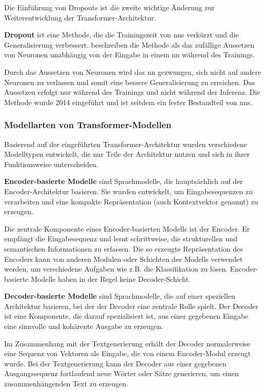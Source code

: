 Die Einführung von Dropouts ist die zweite wichtige Änderung zur Weiterentwicklung der Transformer-Architektur.
\begin{definition}\label{def:dropout}
    \textbf{Dropout} ist eine Methode, die die Trainingszeit von \ac{nn}s verkürzt und die Generalisierung verbessert.
    \citet{dropout} beschreiben die Methode als das zufällige Aussetzen von Neuronen unabhängig von der Eingabe in einem \ac{nn} während des Trainings.
\end{definition}
Durch das Aussetzen von Neuronen wird das \ac{nn} gezwungen, sich nicht auf andere Neuronen zu verlassen und somit eine bessere Generalisierung zu erreichen.
Das Aussetzen erfolgt nur während des Trainings und nicht während der Inferenz.
Die Methode wurde 2014 eingeführt und ist seitdem ein fester Bestandteil von \ac{nn}s.\\

\subsubsection{Modellarten von Transformer-Modellen}

Basierend auf der eingeführten Transformer-Architektur wurden verschiedene Modelltypen entwickelt, die nur Teile der Architektur nutzen und sich in ihrer Funktionsweise unterscheiden.

\begin{definition}\label{def:encoder-basierte-modelle}
    \textbf{Encoder-basierte Modelle} sind Sprachmodelle, die hauptsächlich auf der Encoder-Architektur basieren.
    Sie wurden entwickelt, um Eingabesequenzen zu verarbeiten und eine kompakte Repräsentation (auch Kontextvektor genannt) zu erzeugen.
\end{definition}
Die zentrale Komponente eines Encoder-basierten Modells ist der Encoder.
Er empfängt die Eingabesequenz und lernt schrittweise, die strukturellen und semantischen Informationen zu erfassen.
Die so erzeugte Repräsentation des Encoders kann von anderen Modulen oder Schichten des Modells verwendet werden, um verschiedene Aufgaben
wie z.B. die Klassifikation zu lösen.
Encoder-basierte Modelle haben in der Regel keine Decoder-Schicht.\\

\begin{definition}\label{def:decoder-basierte-modelle}
    \textbf{Decoder-basierte Modelle} sind Sprachmodelle, die auf einer speziellen Architektur basieren, bei der der Decoder eine zentrale Rolle spielt.
    Der Decoder ist eine Komponente, die darauf spezialisiert ist, aus einer gegebenen Eingabe eine sinnvolle und kohärente Ausgabe zu erzeugen.
\end{definition}
Im Zusammenhang mit der Textgenerierung erhält der Decoder normalerweise eine Sequenz von Vektoren als Eingabe, die von einem Encoder-Modul erzeugt wurde.
Bei der Textgenerierung kann der Decoder aus einer gegebenen Ausgangssequenz fortlaufend neue Wörter oder Sätze generieren, um einen zusammenhängenden Text zu erzeugen.

